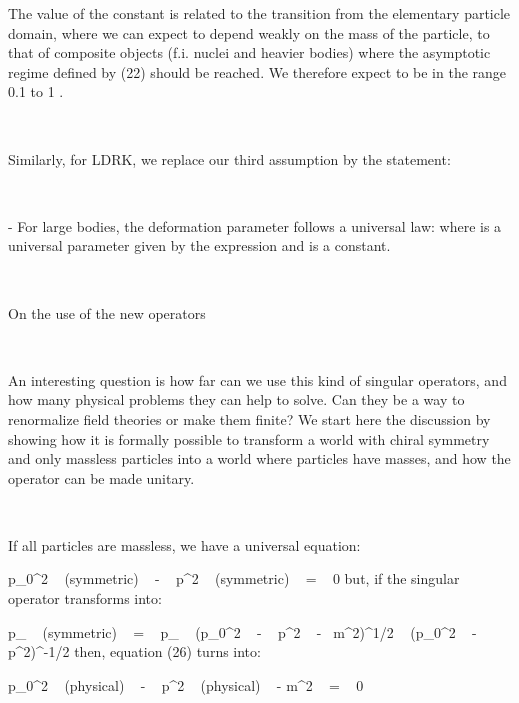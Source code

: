 \documentclass[a4paper,12pt,dvips]{article}
\makeatletter
\renewcommand{\section}{\@startsection{section}{1}{0in}
	{0.4\baselineskip}{0.1\baselineskip}{\Large\bf}}
\makeatother
\begin{document}
The value of the constant \coordHE{} is related to the transition from the elementary particle domain, where we can expect \myHighlight{$\epsilon $}\coordHE{} to depend weakly on the mass of the particle, to that of composite objects (f.i. nuclei and heavier bodies) where the asymptotic regime defined by (22) should be reached. We therefore expect \coordHE{} to be in the range 0.1 to 1 \coordHE{}.

~ 

Similarly, for LDRK, we replace our third assumption by the statement:

~ 

- For large bodies, the deformation parameter \myHighlight{$\mu $}\coordHE{} follows a universal law: \coordHE{} where \coordHE{} is a universal parameter given by the expression \coordHE{} and \myHighlight{$\rho $}\coordHE{} is a constant.

~
~

\section{On the use of the new operators}
\label{renor.sec}
\vspace{0.5ex}

~

An interesting question is how far can we use this kind of singular operators, and how many physical problems they can help to solve. Can they be a way to renormalize field theories or make them finite? We start here the discussion by showing how it is formally possible to transform a world with chiral symmetry and only massless particles into a world where particles have masses, and how the operator \coordHE{} can be made unitary. 

~ 

If all particles are massless, we have a universal equation:

\equation
p_0^2 ~ (symmetric) ~ - ~ p^2 ~ (symmetric) ~ = ~ 0
\endequation
\noindent
but, if the singular operator \coordHE{} transforms \coordHE{} into: 

\equation
p_{\alpha } ~ (symmetric) ~ = ~ p_{\alpha } ~ (p_0^2 ~ - ~ p^2 ~ -~ m^2)^{1/2} ~ (p_0^2 ~ - ~ p^2)^{-1/2}
\endequation
\noindent
then, equation (26) turns into:

\equation
p_0^2 ~ (physical) ~ - ~ p^2 ~ (physical) ~ - m^2 ~ = ~ 0
\endequation
\noindent
\end{document}
